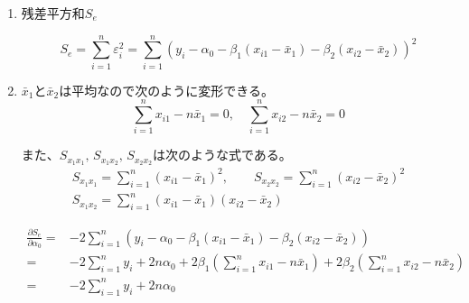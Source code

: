 \documentclass[12pt,b5paper]{ltjsarticle}
\begin{document}
\begin{enumerate}
      \dotfill

      \begin{enumerate}
       \item
            残差平方和$S_e$

            \begin{equation}
             S_e = \sum_{i=1}^{n} \varepsilon_i^2
             = \sum_{i=1}^{n}
             ( y_i - \alpha_0 - \beta_1 (x_{i1}-\bar{x}_1) - \beta_2 (x_{i2}-\bar{x}_2) )^2
            \end{equation}


       \item
            $\bar{x}_1$と$\bar{x}_2$は平均なので次のように変形できる。
            \begin{equation}
             \sum_{i=1}^{n}x_{i1}-n\bar{x}_1 = 0,
              \quad \sum_{i=1}^{n}x_{i2}-n\bar{x}_2 =0
            \end{equation}

            また、$S_{x_1x_1},\,S_{x_1x_2},\,S_{x_2x_2}$は次のような式である。
            \begin{gather}
             S_{x_1x_1} = \sum_{i=1}^{n}\left( x_{i1}-\bar{x}_1 \right)^2 ,
             \qquad
             S_{x_2x_2} = \sum_{i=1}^{n}\left( x_{i2}-\bar{x}_2 \right)^2\\
             S_{x_1x_2} = \sum_{i=1}^{n}( x_{i1}-\bar{x}_1 )( x_{i2}-\bar{x}_2 )
            \end{gather}

            \begin{align}
             \frac{\partial S_e}{\partial \alpha_0}
             =& -2\sum_{i=1}^{n}
             ( y_i - \alpha_0 - \beta_1 (x_{i1}-\bar{x}_1) - \beta_2 (x_{i2}-\bar{x}_2) )\\
             =& -2\sum_{i=1}^{n}y_i + 2n\alpha_0
             + 2\beta_1 \left( \sum_{i=1}^{n}x_{i1}-n\bar{x}_1 \right)
             + 2\beta_2 \left( \sum_{i=1}^{n}x_{i2}-n\bar{x}_2 \right) \\
             =& -2\sum_{i=1}^{n}y_i + 2n\alpha_0
            \end{align}


\end{enumerate}
\end{enumerate}
\end{document}
